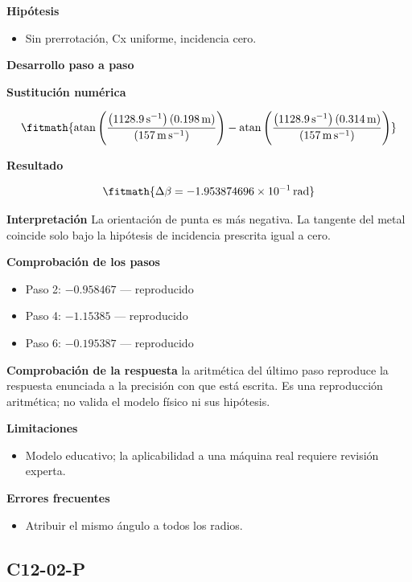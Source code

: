 \documentclass[10pt,openany]{book}
\begin{document}
\noindent\textbf{Hipótesis}
\begin{itemize}
\item Sin prerrotación, Cx uniforme, incidencia cero.
\end{itemize}

\noindent\textbf{Desarrollo paso a paso}



\noindent\textbf{Sustitución numérica}

\[
\fitmath{\operatorname{atan}{\left(\frac{\left(1128.9\,\mathrm{s}^{-1}\right) \left(0.198\,\mathrm{m}\right)}{\left(157\,\mathrm{m}\,\mathrm{s}^{-1}\right)} \right)} - \operatorname{atan}{\left(\frac{\left(1128.9\,\mathrm{s}^{-1}\right) \left(0.314\,\mathrm{m}\right)}{\left(157\,\mathrm{m}\,\mathrm{s}^{-1}\right)} \right)}}
\]

\noindent\textbf{Resultado}

\[
\fitmath{\Delta\beta=-1.953874696\times10^{-1}\,\mathrm{rad}}
\]

\noindent\textbf{Interpretación}
La orientación de punta es más negativa. La tangente del metal coincide solo bajo la hipótesis de incidencia prescrita igual a cero.

\noindent\textbf{Comprobación de los pasos}
\begin{itemize}
\item Paso 2: $-0.958467$ — reproducido
\item Paso 4: $-1.15385$ — reproducido
\item Paso 6: $-0.195387$ — reproducido
\end{itemize}

\noindent\textbf{Comprobación de la respuesta} la aritmética del último paso reproduce la respuesta enunciada a la precisión con que está escrita. Es una reproducción aritmética; no valida el modelo físico ni sus hipótesis.

\noindent\textbf{Limitaciones}
\begin{itemize}
\item Modelo educativo; la aplicabilidad a una máquina real requiere revisión experta.
\end{itemize}

\noindent\textbf{Errores frecuentes}
\begin{itemize}
\item Atribuir el mismo ángulo a todos los radios.
\end{itemize}
\subsection*{C12-02-P}
\end{document}
